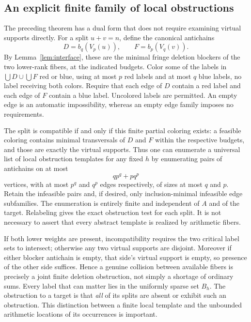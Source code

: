 \documentclass[11pt]{article}
\theoremstyle{remark}\newtheorem{remark}[theorem]{Remark}
\begin{document}
\subsection{An explicit finite family of local obstructions}
The preceding theorem has a dual form that does not require examining virtual supports directly. For a split $u+v=n$, define the canonical antichains
\[
 D=b_q(V_p(u)),\qquad F=b_p(V_q(v)).
\]
By Lemma~\ref{lem:interface}, these are the minimal fringe deletion blockers of the two lower-rank fibers, at the indicated budgets. Color some of the labels in $\bigcup D\cup\bigcup F$ red or blue, using at most $p$ red labels and at most $q$ blue labels, no label receiving both colors. Require that each edge of $D$ contain a red label and each edge of $F$ contain a blue label. Uncolored labels are permitted. An empty edge is an automatic impossibility, whereas an empty edge family imposes no requirements.

The split is compatible if and only if this finite partial coloring exists: a feasible coloring contains minimal transversals of $D$ and $F$ within the respective budgets, and those are exactly the virtual supports. Thus one can enumerate a universal list of local obstruction templates for any fixed $h$ by enumerating pairs of antichains on at most
\[q p^q+p q^p\]
vertices, with at most $p^q$ and $q^p$ edges respectively, of sizes at most $q$ and $p$. Retain the infeasible pairs and, if desired, only inclusion-minimal infeasible edge subfamilies. The enumeration is entirely finite and independent of $A$ and of the target. Relabeling gives the exact obstruction test for each split. It is not necessary to assert that every abstract template is realized by arithmetic fibers.

If both lower weights are present, incompatibility requires the two critical label sets to intersect; otherwise any two virtual supports are disjoint. Moreover if either blocker antichain is empty, that side's virtual support is empty, so presence of the other side suffices. Hence a genuine collision between available fibers is precisely a joint finite deletion obstruction, not simply a shortage of ordinary sums. Every label that can matter lies in the uniformly sparse set $B_h$. The obstruction to a target is that \emph{all} of its splits are absent or exhibit such an obstruction. This distinction between a finite local template and the unbounded arithmetic locations of its occurrences is important.
\end{document}
